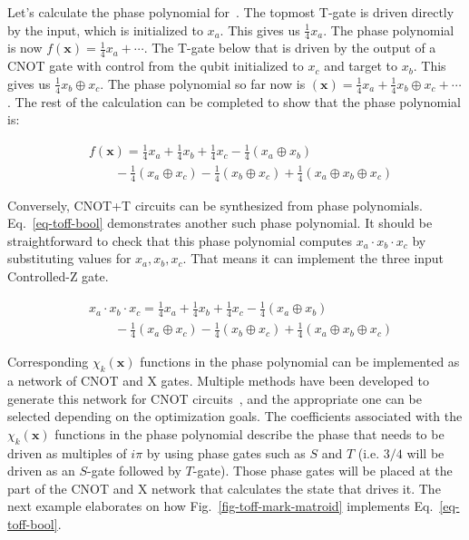 \begin{example}
  Let's calculate the phase polynomial for~. The topmost
  T-gate is driven directly by the input, which is initialized to $x_a$. This gives us
  $\frac{1}{4} x_a$. The phase polynomial is now $f(\mathbf{x}) = \frac{1}{4} x_a + \cdots$.
  The T-gate below that is driven by the output of a CNOT gate with control from the qubit
  initialized to $x_c$ and target to $x_b$. This gives us $\frac{1}{4} x_b \oplus x_c$. The
  phase polynomial so far now is
  $(\mathbf{x}) = \frac{1}{4} x_a + \frac{1}{4} x_b \oplus x_c + \cdots$. The rest of the
  calculation can be completed to show that the phase polynomial is:

  \begin{equation}
    \label{eq-pp-ex}
    \begin{aligned}
      &f(\mathbf{x}) = \frac{1}{4}x_a + \frac{1}{4}x_b + \frac{1}{4}x_c - \frac{1}{4}(x_a \oplus x_b) \\
      &\qquad -\frac{1}{4}(x_a \oplus x_c) - \frac{1}{4}(x_b \oplus x_c) + \frac{1}{4}(x_a \oplus x_b \oplus x_c)\nonumber
    \end{aligned}
  \end{equation}

\end{example}

Conversely, CNOT+T circuits can be synthesized from phase polynomials.
Eq.~\ref{eq-toff-bool} demonstrates another such phase polynomial. It should be
straightforward to check that this phase polynomial computes $x_a \cdot x_b \cdot x_c$ by
substituting values for $x_a, x_b, x_c$. That means it can implement the three input
Controlled-Z gate.

\begin{equation}
  \label{eq-toff-bool}
  \begin{aligned}
    &x_a \cdot x_b \cdot x_c = \frac{1}{4}x_a + \frac{1}{4}x_b + \frac{1}{4}x_c - \frac{1}{4}(x_a \oplus x_b) \\
    &\qquad -\frac{1}{4}(x_a \oplus x_c) - \frac{1}{4}(x_b \oplus x_c) + \frac{1}{4}(x_a \oplus x_b \oplus x_c)
  \end{aligned}
\end{equation}

Corresponding $\chi_k(\mathbf{x})$ functions in the phase polynomial can be implemented as a
network of CNOT and X gates. Multiple methods have been developed to generate this
network for CNOT circuits~\cite{bib-barenco-elementary,bib-amy-cnot}, and the appropriate
one can be selected depending on the optimization goals. The coefficients associated with
the $\chi_k(\mathbf{x})$ functions in the phase polynomial describe the phase that needs to
be driven as multiples of $i\pi$ by using phase gates such as $S$ and $T$ (i.e. $3/4$ will
be driven as an $S$-gate followed by $T$-gate). Those phase gates will be placed at the
part of the CNOT and X network that calculates the state that drives it. The next example
elaborates on how Fig.~\ref{fig-toff-mark-matroid} implements Eq.~\ref{eq-toff-bool}.

